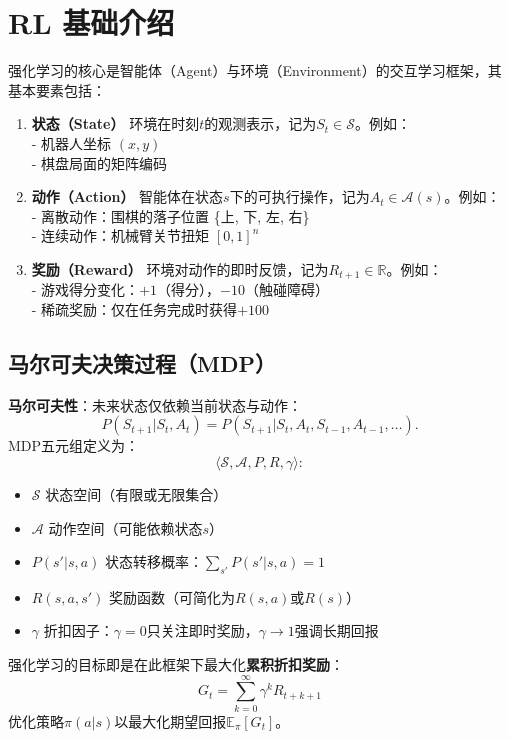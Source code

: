 \section{RL 基础介绍}
强化学习的核心是智能体（Agent）与环境（Environment）的交互学习框架，其基本要素包括：
\begin{enumerate}%
  \item \textbf{状态（State）} 环境在时刻$t$的观测表示，记为$S_t \in \mathcal{S}$。例如：\\
  - 机器人坐标 $(x,y)$ \\
  - 棋盘局面的矩阵编码
  
  \item \textbf{动作（Action）} 智能体在状态$s$下的可执行操作，记为$A_t \in \mathcal{A}(s)$。例如：\\
  - 离散动作：围棋的落子位置 \{上, 下, 左, 右\} \\
  - 连续动作：机械臂关节扭矩 $[0, 1]^n$
  
  \item \textbf{奖励（Reward）} 环境对动作的即时反馈，记为$R_{t+1} \in \mathbb{R}$。例如：\\
  - 游戏得分变化：$+1$（得分），$-10$（触碰障碍） \\
  - 稀疏奖励：仅在任务完成时获得$+100$
\end{enumerate}

\subsection{马尔可夫决策过程（MDP）}
\textbf{马尔可夫性}：未来状态仅依赖当前状态与动作：
\[
P(S_{t+1}|S_t, A_t) = P(S_{t+1}|S_t, A_t, S_{t-1}, A_{t-1}, \dots).
\]
MDP五元组定义为：
\[
\langle \mathcal{S}, \mathcal{A}, P, R, \gamma \rangle:
\]
\begin{itemize}%
  \item $\mathcal{S}$ 状态空间（有限或无限集合）
  \item $\mathcal{A}$ 动作空间（可能依赖状态$s$）
  \item $P(s'|s,a)$ 状态转移概率：$\sum_{s'} P(s'|s,a) = 1$
  \item $R(s,a,s')$ 奖励函数（可简化为$R(s,a)$或$R(s)$）
  \item $\gamma$ 折扣因子：$\gamma=0$只关注即时奖励，$\gamma \to 1$强调长期回报
\end{itemize}

强化学习的目标即是在此框架下最大化\textbf{累积折扣奖励}：
\begin{equation}
  G_t = \sum_{k=0}^{\infty} \gamma^k R_{t+k+1}
\end{equation}
优化策略$\pi(a|s)$以最大化期望回报$\mathbb{E}_\pi[G_t]$。

